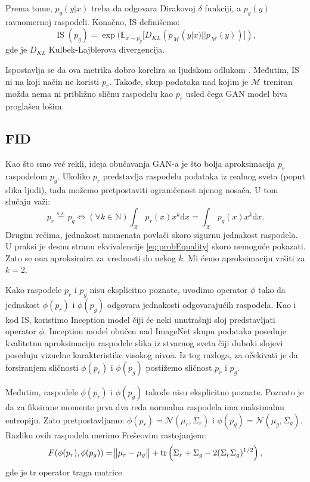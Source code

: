 \documentclass[12pt, a4paper]{article}
\begin{document}
Prema tome, $p_g(y|x)$ treba da odgovara Dirakovoj $\delta$ funkciji, a $p_g(y)$ ravnomernoj raspodeli. Konačno, IS definišemo:
\begin{equation}
\operatorname{IS}(p_g) = \exp(\mathbb{E}_{x \sim p_g}[D_{KL}(p_\mathcal{M}(y|x)||p_\mathcal{M}(y))]),
\end{equation}
gde je $D_{KL}$ Kulbek-Lajblerova divergencija.

Ispostavlja se da ova metrika dobro korelira sa ljudskom odlukom \cite{IS-2016}. Međutim, IS ni na koji način ne koristi $p_r$. Takođe, skup podataka nad kojim je $\mathcal{M}$ treniran možda nema ni približno sličnu raspodelu kao $p_r$ usled čega GAN model biva proglašen lošim.

\subsection{FID}
Kao što smo već rekli, ideja obučavanja GAN-a je što bolja aproksimacija $p_r$ raspodelom $p_g$. Ukoliko $p_r$ predstavlja raspodelu podataka iz realnog sveta (poput slika ljudi), tada možemo pretpostaviti ograničenost njenog nosača. U tom slučaju važi:
\begin{equation}
p_r \stackrel{s.s.}{=} p_q \iff (\forall k \in \mathbb{N}) \int_{\mathcal{X}} p_r(x) x^k \text{d}x = \int_{\mathcal{X}} p_g(x) x^k \text{d}x.
\label{eq:probEquality}
\end{equation}
Drugim rečima, jednakost momenata povlači skoro sigurnu jednakost raspodela. U praksi je desnu stranu ekvivalencije \ref{eq:probEquality} skoro nemoguće pokazati. Zato se ona aproksimira za vrednosti do nekog $k$. Mi ćemo aproksimaciju vršiti za $k=2$.

Kako raspodele $p_r$ i $p_g$ nisu eksplicitno poznate, uvodimo operator $\phi$ tako da jednakost $\phi(p_r)$ i $\phi(p_g)$ odgovara jednakosti odgovarajućih raspodela. Kao i kod IS, koristimo Inception model čiji će neki unutrašnji sloj predstavljati operator $\phi$. Inception model obučen nad ImageNet skupu podataka poseduje kvalitetnu aproksimaciju raspodele slika iz stvarnog sveta čiji duboki slojevi poseduju vizuelne karakteristike visokog nivoa. Iz tog razloga, za očekivati je da forsiranjem sličnosti $\phi(p_r)$ i $\phi(p_g)$ postižemo sličnost $p_r$ i $p_g$.

Međutim, raspodele $\phi(p_r)$ i $\phi(p_g)$ takođe nisu eksplicitno poznate. Poznato je da za fiksirane momente prva dva reda normalna raspodela ima maksimalnu entropiju. Zato pretpostavljamo: $\phi(p_r) = \mathcal{N}(\mu_r, \Sigma_r)$ i $\phi(p_g) = \mathcal{N}(\mu_g, \Sigma_g).$ Razliku ovih raspodela merimo Frešeovim rastojanjem:
\begin{equation}
F(\phi(p_r), \phi(p_g)) = \norm{\mu_r - \mu_g} + \text{tr}\left(\Sigma_r + \Sigma_g - 2(\Sigma_r \Sigma_g)^{1/2}\right),
\end{equation}
gde je $\text{tr}$ operator traga matrice.
\end{document}

